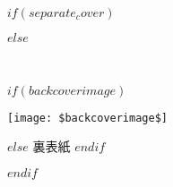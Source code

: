 $if(separate_cover)$

$else$

\clearpage
\clearpage

$if(backcoverimage)$

\enlargethispage{\paperwidth}
\thispagestyle{empty}
\vspace*{-1truein}
\vspace*{-\topmargin}
\vspace*{-\headheight}
\vspace*{-\headsep}
\vspace*{-\topskip}
\noindent\hspace*{-1in}\hspace*{-\evensidemargin}
\texttt{[image: \$backcoverimage\$]}

$else$
裏表紙
$endif$

$endif$

